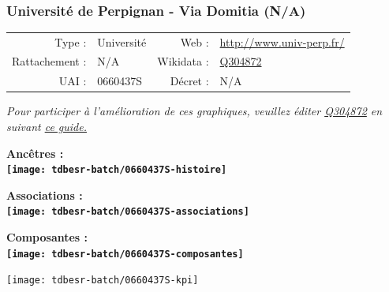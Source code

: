 \documentclass[12pt,french,]{article}
\begin{document}
\ifoddpage ~\newpage \fi   

\hypertarget{universituxe9-de-perpignan---via-domitia-na}{%
\subsubsection{Université de Perpignan - Via Domitia
(N/A)}\label{universituxe9-de-perpignan---via-domitia-na}}

\begin{tabular*}{\textwidth}{rp{5cm}rl}  
\hline  
Type : & Université & Web : &\href{http://www.univ-perp.fr/}{http://www.univ-perp.fr/} \\  
Rattachement : & N/A & Wikidata : & \href{https://www.wikidata.org/entity/Q304872}{Q304872} \\  
UAI : & 0660437S & Décret : & N/A \\  
\hline  
\end{tabular*}

\textit{\scriptsize Pour participer à l'amélioration de ces graphiques, veuillez éditer  \href{https://www.wikidata.org/entity/Q304872}{Q304872}  en suivant \href{https://github.com/cpesr/wikidataESR/blob/master/Rmd/wikidataESR.md}{ce guide.}}

\vspace{1cm}  
\begin{minipage}[b]{0.50\textwidth}\begin{center} \bf Ancêtres : \\  
\texttt{[image: tdbesr-batch/0660437S-histoire]} \end{center}\end{minipage}\begin{minipage}[b]{0.50\textwidth}\begin{center} \bf Associations : \\  
\texttt{[image: tdbesr-batch/0660437S-associations]} \end{center}\end{minipage}

\hrulefill

\begin{center} \bf Composantes : \\  
\texttt{[image: tdbesr-batch/0660437S-composantes]} \end{center}

\begin{center}\texttt{[image: tdbesr-batch/0660437S-kpi]} \end{center}\checkoddpage

\ifoddpage ~\newpage \fi   
\end{document}
